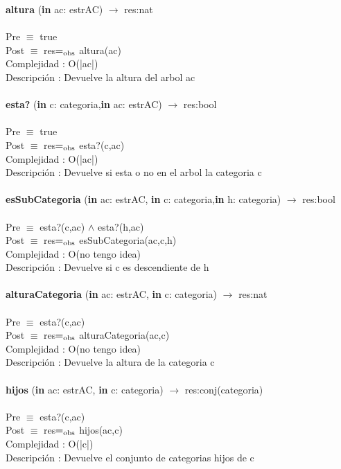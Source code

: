 \documentclass[10pt, a4paper]{article}
\begin{document}
	\textbf{altura} (\textbf{in} ac: estrAC) $\longrightarrow$ res:nat\\\\
	Pre $\equiv$ {true}\\
	Post $\equiv$ {res$=_{\mathrm{obs}}$ altura(ac)}\\
	Complejidad : O(|ac|)\\
	Descripci\'{o}n : Devuelve la altura del arbol ac\\\\	
	
	\textbf{esta?} (\textbf{in} c: categoria,\textbf{in} ac: estrAC) $\longrightarrow$ res:bool\\\\
	Pre $\equiv$ {true}\\
	Post $\equiv$ {res$=_{\mathrm{obs}}$ esta?(c,ac)}\\
	Complejidad : O(|ac|)\\
	Descripci\'{o}n : Devuelve si esta o no en el arbol la categoria c\\\\	
	
	\textbf{esSubCategoria} (\textbf{in} ac: estrAC, \textbf{in} c: categoria,\textbf{in} h: categoria) $\longrightarrow$ res:bool\\\\
	Pre $\equiv$ {esta?(c,ac) $\wedge$ esta?(h,ac)}\\
	Post $\equiv$ {res$=_{\mathrm{obs}}$ esSubCategoria(ac,c,h)}\\
	Complejidad : O(no tengo idea)\\
	Descripci\'{o}n : Devuelve si c es descendiente de h\\\\	
	
	\textbf{alturaCategoria} (\textbf{in} ac: estrAC, \textbf{in} c: categoria) $\longrightarrow$ res:nat\\\\
	Pre $\equiv$ {esta?(c,ac)}\\
	Post $\equiv$ {res$=_{\mathrm{obs}}$ alturaCategoria(ac,c)}\\
	Complejidad : O(no tengo idea)\\
	Descripci\'{o}n : Devuelve la altura de la categoria c\\\\	
	
	\textbf{hijos} (\textbf{in} ac: estrAC, \textbf{in} c: categoria) $\longrightarrow$ res:conj(categoria)\\\\
	Pre $\equiv$ {esta?(c,ac)}\\
	Post $\equiv$ {res$=_{\mathrm{obs}}$ hijos(ac,c)}\\
	Complejidad : O(|c|)\\
	Descripci\'{o}n : Devuelve el conjunto de categorias hijos de c\\\\	
\end{document}
